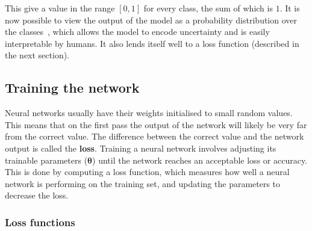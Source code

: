 \documentclass[12pt,a4paper,twoside,openright]{report}
\renewcommand{\vec}[1]{\bm{#1}}
\begin{document}
This give a value in the range $[0,1]$ for every class, the sum of which is $1$. It is now possible to view the output of the model as a 
probability distribution over the classes~\cite{10.1007/978-3-642-76153-9_28}, which allows the model to encode uncertainty and is easily interpretable by humans. It also lends 
itself well to a loss function (described in the next section).

\subsection{Training the network}

Neural networks usually have their weights initialised to small random values. This means that on the first pass
the output of the network will likely be very far from the correct value. The difference between the correct
value and the network output is called the \textbf{loss}. Training a neural network involves adjusting its
trainable parameters ($\vec{\theta}$) until the network reaches an acceptable loss or accuracy. This is done by computing
a loss function, which measures how well a neural network is performing on the training set, and updating the parameters to decrease the loss.

\subsubsection{Loss functions}
\end{document}
